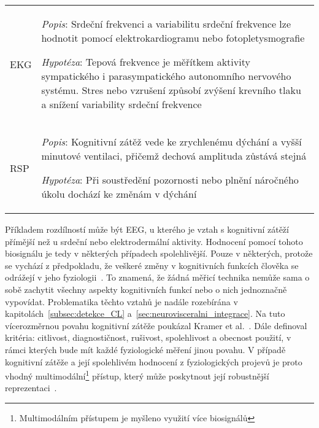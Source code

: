 \begin{table}[ht]
\begin{threeparttable}
\begin{tabular}{p{3cm}p{11cm}}
            \\
            EKG                 & \textit{Popis}: Srdeční frekvenci a variabilitu srdeční frekvence lze hodnotit pomocí elektrokardiogramu nebo fotopletysmografie\newline
            \rule{0pt}{2.5ex}\noindent
            \textit{Hypotéza}: Tepová frekvence je měřítkem aktivity sympatického i parasympatického autonomního nervového systému. Stres nebo vzrušení způsobí zvýšení krevního tlaku a snížení variability srdeční frekvence~\cite{Jercic2020,Solhjoo2019}
            \\
            RSP                 & \textit{Popis}: Kognitivní zátěž vede ke zrychlenému dýchání a vyšší minutové ventilaci, přičemž dechová amplituda zůstává stejná\newline
            \rule{0pt}{2.5ex}\noindent
            \textit{Hypotéza}: Při soustředění pozornosti nebo plnění náročného úkolu dochází ke změnám v dýchání~\cite{Grassmann2016}
            \\
            \bottomrule
        \end{tabular}
    \end{threeparttable}
\end{table}

Příkladem rozdílností může být EEG, u kterého je vztah s kognitivní zátěží
přímější než u srdeční nebo elektrodermální aktivity. Hodnocení pomocí tohoto
biosignálu je tedy v některých případech spolehlivější. Pouze v některých,
protože se vychází z předpokladu, že veškeré změny v kognitivních funkcích
člověka se odrážejí v jeho fyziologii~\cite{Vanneste2021}. To znamená, že žádná
měřicí technika nemůže sama o sobě zachytit všechny aspekty kognitivních funkcí
nebo o nich jednoznačně vypovídat. Problematika těchto vztahů je nadále
rozebírána v kapitolách~\ref{subsec:detekce_CL}
a~\ref{sec:neurovisceralni_integrace}. Na tuto vícerozměrnou povahu kognitivní
zátěže poukázal Kramer et al.~\cite{Kramer1991}. Dále definoval kritéria:
citlivost, diagnostičnost, rušivost, spolehlivost a obecnost použití, v rámci
kterých bude mít každé fyziologické měření jinou povahu. V případě kognitivní
zátěže a její spolehlivém hodnocení z fyziologických projevů je proto vhodný
multimodální\footnote{Multimodálním přístupem je myšleno využití více
    biosignálů} přístup, který může poskytnout její robustnější
reprezentaci~\cite{Chen2016}.

